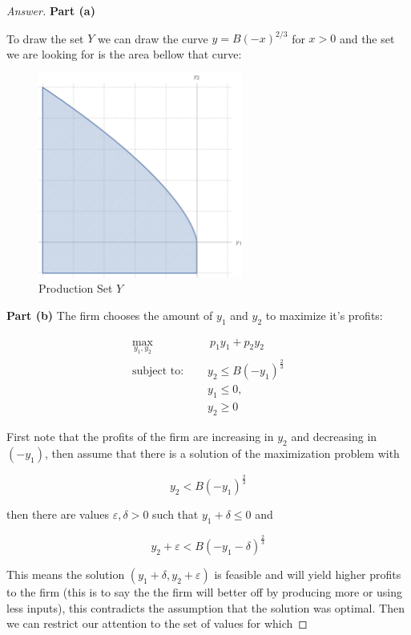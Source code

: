 \documentclass{article}
\theoremstyle{definition}
\begin{document}
\begin{proof}[Answer]

\textbf{Part (a)}

To draw the set $Y$ we can draw the curve $y = B(-x)^{2/3}$ for $x>0$ and the set we are looking for is the area bellow that curve:

\begin{figure}[h]
  \centering
    \includegraphics[width=0.6\textwidth]{Problem Set 2 Files/set.pdf}
    \caption{Production Set $Y$}
\end{figure}

\textbf{Part (b)} The firm chooses the amount of $y_1$ and $y_2$ to maximize it's profits:

\begin{align*}
    \max_{y_1,y_2}\quad &\: p_1 y_1 + p_2 y_2\\
     \text{subject to: }\quad &  y_2 \leq B\left(-y_{1}\right)^{\frac{2}{3}}\\
     &y_1\leq 0,\\& y_2\geq 0
\end{align*}

First note that the profits of the firm are increasing in $y_2$ and decreasing in $(-y_1)$, then assume that there is a solution of the maximization problem with 

$$y_2 < B\left(-y_{1}\right)^{\frac{2}{3}}$$

then there are values $\varepsilon, \delta>0$ such that $y_1+\delta \leq 0$ and 

$$y_2 + \varepsilon < B\left(-y_{1}-\delta \right)^{\frac{2}{3}}$$

This means the solution $(y_1+\delta, y_2+\varepsilon)$ is feasible and will yield higher profits to the firm (this is to say the the firm will better off by producing more or using less inputs), this contradicts the assumption that the solution was optimal. Then we can restrict our attention to the set of values for which


\end{proof}
\end{document}
